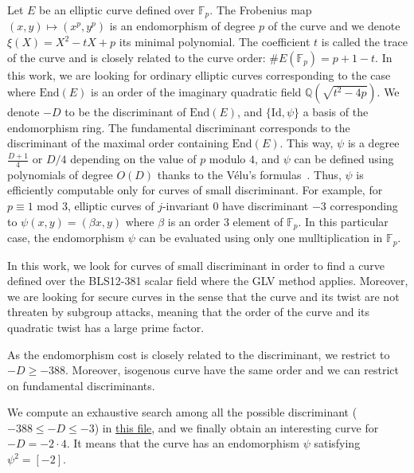 \documentclass{amsart}
\newcommand{\Q}{\ensuremath{\mathbb Q}}
\newcommand{\Fp}{\ensuremath{\mathbb F_p}}
\newcommand{\End}{\ensuremath{\text{End}}}
\begin{document}
Let $E$ be an elliptic curve defined over $\Fp$. The Frobenius
map $(x,y)\mapsto (x^p,y^p)$ is an endomorphism of degree $p$ of the
curve and we denote $\xi(X) = X^2 - tX + p$ its minimal polynomial.
The coefficient $t$ is called the trace of the curve and is closely
related to the curve order: $\#E(\Fp) = p+1-t$.
In this work, we are looking for ordinary elliptic curves
corresponding to the case where $\End(E)$ is an order of the imaginary
quadratic field $\Q(\sqrt{t^2-4p})$.
We denote $-D$ to be the discriminant of $\End(E)$, and $\{\text{Id},\psi\}$
a basis of the endomorphism ring. The fundamental discriminant
corresponds to the discriminant of the maximal order containing $\End(E)$.
This way, $\psi$ is a degree $\frac{D+1}4$ or $D/4$ depending on the
value of $p$ modulo $4$, and $\psi$ can be defined using polynomials
of degree $O(D)$ thanks to the Vélu's formulas~\cite{velu71}.
Thus, $\psi$ is efficiently computable only for curves of small discriminant.
For example, for $p\equiv 1$ mod $3$, elliptic curves of $j$-invariant $0$
have discriminant $-3$ corresponding to $\psi(x,y) = (\beta x, y)$
where $\beta$ is an order $3$ element of $\Fp$.
In this particular case, the endomorphism $\psi$ can be evaluated
using only one mulltiplication in $\Fp$.

In this work, we look for curves of small discriminant in order to
find a curve defined over the BLS12-381 scalar field where the GLV
method applies. Moreover, we are looking for secure curves in the
sense that the curve and its twist are not threaten by subgroup
attacks, meaning that the order of the curve and its quadratic twist
has a large prime factor.

As the endomorphism cost is closely related to the discriminant, we
restrict to $-D \geq -388$. Moreover, isogenous curve have the same
order and we can restrict on fundamental discriminants.

We compute an exhaustive search among all the possible discriminant
($-388 \leq -D \leq -3$) in
\href{https://github.com/asanso/Bandersnatch/blob/main/code/small-disc-curves.py}{this
  file}, and we finally obtain an interesting curve for $-D = -2 \cdot 4$.
It means that the curve has an endomorphism $\psi$ satisfying $\psi^2
= [-2]$.
\end{document}
